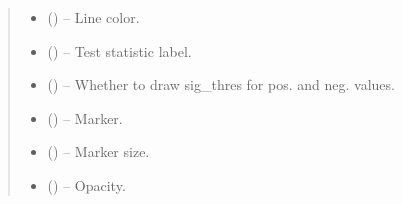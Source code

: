 \documentclass[letterpaper,10pt,english]{sphinxmanual}
\begin{document}
\begin{fulllineitems}
\begin{fulllineitems}
\begin{quote}
\begin{description}
\begin{itemize}
\item {} 
 (\sphinxstyleliteralemphasis{, }\sphinxstyleliteralemphasis{ (}\sphinxstyleliteralemphasis{)}\sphinxstyleliteralemphasis{}) -- Line color.

\item {} 
 () -- Test statistic label.

\item {} 
 (\sphinxstyleliteralemphasis{, }\sphinxstyleliteralemphasis{ (}\sphinxstyleliteralemphasis{)}\sphinxstyleliteralemphasis{}) -- Whether to draw sig\_thres for pos. and neg. values.

\item {} 
 (\sphinxstyleliteralemphasis{, }\sphinxstyleliteralemphasis{ (}\sphinxstyleliteralemphasis{)}\sphinxstyleliteralemphasis{}) -- Marker.

\item {} 
 (\sphinxstyleliteralemphasis{, }\sphinxstyleliteralemphasis{ (}\sphinxstyleliteralemphasis{)}\sphinxstyleliteralemphasis{}) -- Marker size.

\item {} 
 (\sphinxstyleliteralemphasis{, }\sphinxstyleliteralemphasis{ (}\sphinxstyleliteralemphasis{)}\sphinxstyleliteralemphasis{}) -- Opacity.

\end{itemize}

\end{description}\end{quote}

\end{fulllineitems}



\end{fulllineitems}
\end{document}
